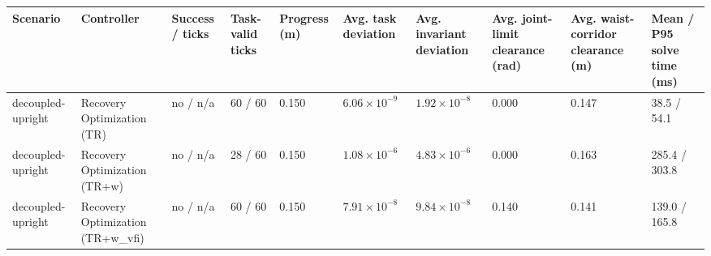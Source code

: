 \begin{tabular}{llllllllll}
\toprule
Scenario & Controller & Success / ticks & Task-valid ticks & Progress (m) & Avg. task deviation & Avg. invariant deviation & Avg. joint-limit clearance (rad) & Avg. waist-corridor clearance (m) & Mean / P95 solve time (ms) \\
\midrule
decoupled-upright & Recovery Optimization (TR) & no / n/a & 60 / 60 & 0.150 & $6.06\times 10^{-9}$ & $1.92\times 10^{-8}$ & 0.000 & 0.147 & 38.5 / 54.1 \\
decoupled-upright & Recovery Optimization (TR+w) & no / n/a & 28 / 60 & 0.150 & $1.08\times 10^{-6}$ & $4.83\times 10^{-6}$ & 0.000 & 0.163 & 285.4 / 303.8 \\
decoupled-upright & Recovery Optimization (TR+w\_vfi) & no / n/a & 60 / 60 & 0.150 & $7.91\times 10^{-8}$ & $9.84\times 10^{-8}$ & 0.140 & 0.141 & 139.0 / 165.8 \\
\bottomrule
\end{tabular}
